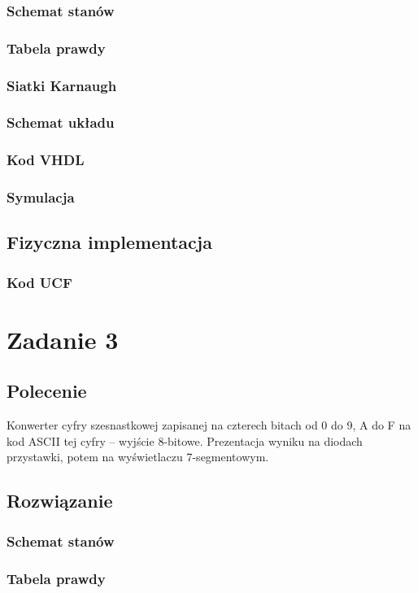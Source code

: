 \documentclass[a4paper,12pt]{extarticle}  %
\begin{document}
\subsubsection{Schemat stanów}

\subsubsection{Tabela prawdy}
\subsubsection{Siatki Karnaugh}
\subsubsection{Schemat układu}
\subsubsection{Kod VHDL}
\subsubsection{Symulacja}
\subsection{Fizyczna implementacja}
\subsubsection{Kod UCF}

\section{Zadanie 3}
\subsection{Polecenie}
Konwerter cyfry szesnastkowej zapisanej na czterech bitach od 0 do 9, A do F 
na kod ASCII tej cyfry – wyjście 8-bitowe. Prezentacja wyniku na diodach 
przystawki, potem na wyświetlaczu 7-segmentowym. 
\subsection{Rozwiązanie}
\subsubsection{Schemat stanów}
\subsubsection{Tabela prawdy}
\end{document}
